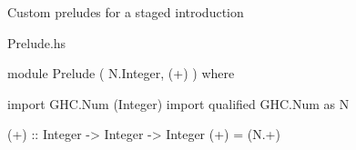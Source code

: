 \begin{frame}[fragile]

{\large
Custom preludes for a staged introduction
}
\nl

\begin{block}{Prelude.hs}
\begin{haskellcode}
module Prelude
  ( N.Integer, (+)
  )
where

import GHC.Num (Integer)
import qualified GHC.Num as N

(+) :: Integer -> Integer -> Integer
(+) = (N.+)
\end{haskellcode}
\end{block}
\end{frame}





